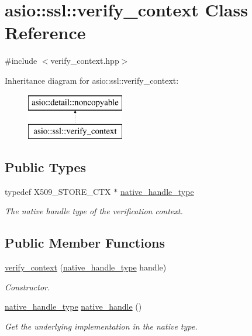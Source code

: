 \hypertarget{classasio_1_1ssl_1_1verify__context}{}\section{asio\+:\+:ssl\+:\+:verify\+\_\+context Class Reference}
\label{classasio_1_1ssl_1_1verify__context}


{\ttfamily \#include $<$verify\+\_\+context.\+hpp$>$}

Inheritance diagram for asio\+:\+:ssl\+:\+:verify\+\_\+context\+:\begin{figure}[H]
\begin{center}
\leavevmode
\includegraphics[height=2.000000cm]{classasio_1_1ssl_1_1verify__context}
\end{center}
\end{figure}
\subsection*{Public Types}
\begin{DoxyCompactItemize}
\item 
typedef X509\+\_\+\+S\+T\+O\+R\+E\+\_\+\+C\+T\+X $\ast$ \hyperlink{classasio_1_1ssl_1_1verify__context_a73956909dd38aaf2e244fe2df73e13ce}{native\+\_\+handle\+\_\+type}
\begin{DoxyCompactList}\small\item\em The native handle type of the verification context. \end{DoxyCompactList}\end{DoxyCompactItemize}
\subsection*{Public Member Functions}
\begin{DoxyCompactItemize}
\item 
\hyperlink{classasio_1_1ssl_1_1verify__context_a9730cba171b03605c833b0bdf855b155}{verify\+\_\+context} (\hyperlink{classasio_1_1ssl_1_1verify__context_a73956909dd38aaf2e244fe2df73e13ce}{native\+\_\+handle\+\_\+type} handle)
\begin{DoxyCompactList}\small\item\em Constructor. \end{DoxyCompactList}\item 
\hyperlink{classasio_1_1ssl_1_1verify__context_a73956909dd38aaf2e244fe2df73e13ce}{native\+\_\+handle\+\_\+type} \hyperlink{classasio_1_1ssl_1_1verify__context_a1910482a6eacb6e50ef332878075795d}{native\+\_\+handle} ()
\begin{DoxyCompactList}\small\item\em Get the underlying implementation in the native type. \end{DoxyCompactList}\end{DoxyCompactItemize}


